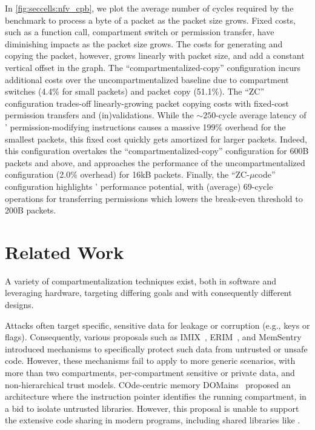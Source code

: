 In \autoref{fig:seccells:nfv_cpb}, we plot the average number of cycles
required by the benchmark to process a byte of a packet
as the packet size grows.
Fixed costs, such as a function call, compartment switch or 
permission transfer, have diminishing impacts as the packet size grows.
The costs for generating and copying the packet, however, grows
linearly with packet size, and add a constant vertical offset in the
graph.
The ``compartmentalized-copy'' configuration incurs additional costs over the
uncompartmentalized baseline due to 
compartment switches (4.4\% for small packets) and packet copy (51.1\%).
The ``\seccells ZC'' configuration trades-off linearly-growing 
packet copying costs with fixed-cost permission transfers and
(in)validations.
While the $\sim250$-cycle average latency of \seccells' 
permission-modifying instructions causes a massive 199\% overhead
for the smallest packets, this fixed cost quickly gets amortized
for larger packets.
Indeed, this configuration overtakes the ``compartmentalized-copy'' configuration
for 600B packets and above, and approaches the performance
of the uncompartmentalized configuration (2.0\% overhead) for
16kB packets.
Finally, the ``\seccells ZC-$\mu$code'' configuration highlights \seccells'
performance potential, with (average) 69-cycle operations for 
transferring permissions which lowers the break-even threshold to
200B packets.

\section{Related Work}
\label{sec:seccells:related}

A variety of compartmentalization techniques exist, both in software and
leveraging hardware, targeting differing goals and with consequently
different designs.

Attacks often target specific, sensitive data for 
leakage or corruption (e.g., keys or flags).
Consequently, various proposals such as IMIX~\cite{FrassettoJLS18},
ERIM~\cite{ERIMOberwagner19}, and MemSentry~\cite{KoningCBGA17} introduced 
mechanisms to specifically protect 
such data from untrusted or unsafe code.
However, these mechanisms fail to apply to more generic scenarios,
with more than two compartments, per-compartment sensitive or private
data, and non-hierarchical trust models.
COde-centric memory DOMains~\cite{VilanovaBNEV14} proposed an architecture
where the instruction pointer identifies the running compartment, in a bid
to isolate untrusted libraries.
However, this proposal is unable to support the extensive code sharing 
in modern programs, including shared libraries like .

